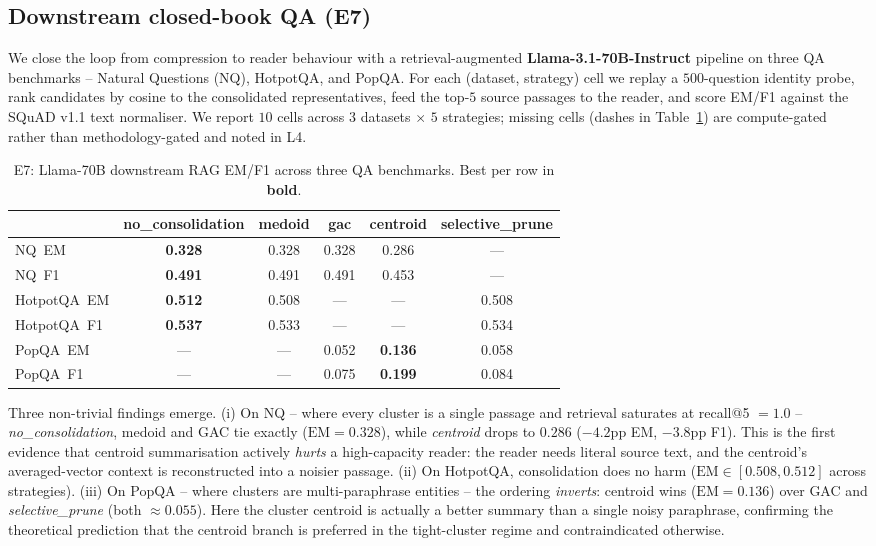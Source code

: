 \documentclass[11pt]{article}
\theoremstyle{definition}
\theoremstyle{remark}
\begin{document}
\subsection*{Downstream closed-book QA (E7)}
We close the loop from compression to reader behaviour with a
retrieval-augmented \textbf{Llama-3.1-70B-Instruct} pipeline on three
QA benchmarks -- Natural Questions (NQ), HotpotQA, and PopQA.  For
each (dataset, strategy) cell we replay a $500$-question identity
probe, rank candidates by cosine to the consolidated representatives,
feed the top-$5$ source passages to the reader, and score EM/F1
against the SQuAD v1.1 text normaliser.  We report $10$ cells across
$3$ datasets $\times$ $5$ strategies; missing cells (dashes in
Table~\ref{tab:e7-70b}) are compute-gated rather than
methodology-gated and noted in L4.

\begin{table}[h]
\centering
\small
\begin{tabular}{lccccc}
\toprule
 & \textbf{no\_consolidation} & \textbf{medoid} & \textbf{gac} & \textbf{centroid} & \textbf{selective\_prune} \\
\midrule
NQ~EM       & \textbf{0.328} & 0.328 & 0.328 & 0.286 & --- \\
NQ~F1       & \textbf{0.491} & 0.491 & 0.491 & 0.453 & --- \\
HotpotQA~EM & \textbf{0.512} & 0.508 & --- & --- & 0.508 \\
HotpotQA~F1 & \textbf{0.537} & 0.533 & --- & --- & 0.534 \\
PopQA~EM    & --- & --- & 0.052 & \textbf{0.136} & 0.058 \\
PopQA~F1    & --- & --- & 0.075 & \textbf{0.199} & 0.084 \\
\bottomrule
\end{tabular}
\caption{E7: Llama-70B downstream RAG EM/F1 across three QA benchmarks.
Best per row in \textbf{bold}.}
\label{tab:e7-70b}
\end{table}

Three non-trivial findings emerge.  (i) On NQ -- where every
cluster is a single passage and retrieval saturates at recall@5
$= 1.0$ -- \emph{no\_consolidation}, medoid and GAC tie exactly
($\mathrm{EM}=0.328$), while \emph{centroid} drops to $0.286$
($-4.2\mathrm{pp}$ EM, $-3.8\mathrm{pp}$ F1).  This is the first
evidence that centroid summarisation actively \emph{hurts} a
high-capacity reader: the reader needs literal source text, and the
centroid's averaged-vector context is reconstructed into a noisier
passage.  (ii) On HotpotQA, consolidation does no harm
($\mathrm{EM}\in[0.508, 0.512]$ across strategies).  (iii) On PopQA --
where clusters are multi-paraphrase entities -- the ordering
\emph{inverts}: centroid wins ($\mathrm{EM}=0.136$) over GAC and
\emph{selective\_prune} (both $\approx 0.055$).  Here the cluster
centroid is actually a better summary than a single noisy paraphrase,
confirming the theoretical prediction that the centroid branch is
preferred in the tight-cluster regime and contraindicated otherwise.
\end{document}
